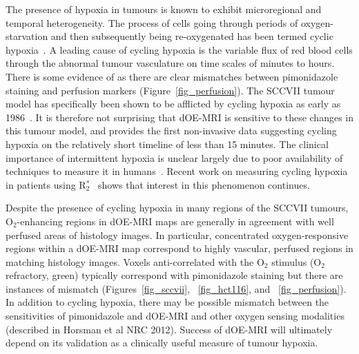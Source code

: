 The presence of hypoxia in tumours is known to exhibit microregional and temporal heterogeneity.
The process of cells going through periods of oxygen-starvation and then subsequently being re-oxygenated has been termed cyclic hypoxia~\cite{Dewhirst:2009de,Bayer:2011js, Bayer:2012kb}.
A leading cause of cycling hypoxia is the variable flux of red blood cells through the abnormal tumour vasculature on time scales of minutes to hours.
There is some evidence of as there are clear mismatches between pimonidazole staining and perfusion markers (Figure~\ref{fig_perfusion}).
The SCCVII tumour model has specifically been shown to be afflicted by cycling hypoxia as early as  1986~\cite{Chaplin:1986ci}.
It is therefore not surprising that \acs{dOE-MRI} is sensitive to these changes in this tumour model, and provides the first non-invasive data suggesting cycling hypoxia on the relatively short timeline of less than 15 minutes.
The clinical importance of intermittent hypoxia is unclear largely due to poor availability of techniques to measure it in humans~\cite{Michiels:2016of}. 
Recent work on measuring cycling hypoxia in patients using R$_2^*$~\cite{Panek:2017ge} shows that interest in this phenomenon continues.

Despite the presence of cycling hypoxia in many regions of the SCCVII tumours, O$_2$-enhancing regions in \acs{dOE-MRI} maps are generally in agreement with well perfused areas of histology images.
In particular, concentrated oxygen-responsive regions within a \acs{dOE-MRI} map correspond to highly vascular, perfused regions in matching histology images.
Voxels anti-correlated with the O$_2$ stimulus (O$_2$ refractory, green) typically correspond with pimonidazole staining but there are instances of mismatch (Figures~\ref{fig_sccvii}, ~\ref{fig_hct116}, and ~\ref{fig_perfusion}).
In addition to cycling hypoxia, there may be possible mismatch between the sensitivities of pimonidazole and dOE-MRI and other oxygen sensing modalities (described in Horsman et al NRC 2012).
Success of dOE-MRI will ultimately depend on its validation as a clinically useful measure of tumour hypoxia.

